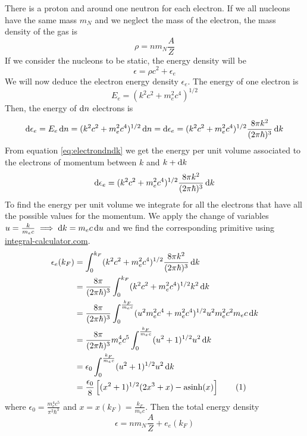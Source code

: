 \documentclass[a4paper]{article}
\newcommand\numberthis{\addtocounter{equation}{1}\tag{\theequation}}
\DeclareMathOperator{\asinh}{asinh}
\begin{document}
There is a proton and around one neutron for each electron. If we all nucleons have the same mass $m_N$ and we neglect the mass of the electron, the mass density of the gas is
\begin{equation} \label{eq:3}
    \rho = n m_N \frac{A}{Z}
\end{equation}
If we consider the nucleons to be static, the energy density will be
\begin{equation} \label{eq:1}
    \epsilon = \rho c^2 + \epsilon_e
\end{equation}
We will now deduce the electron energy density $\epsilon_e$.
The energy of one electron is
\begin{equation}
    E_e = (k^2c^2+m_e^2c^4)^{1/2}
\end{equation}
Then, the energy of $\odif{n}$ electrons is 
\begin{equation}
    \odif{\epsilon_e} = E_e \odif{n} = (k^2c^2+m_e^2c^4)^{1/2} \odif{n}=    \odif{\epsilon_e} = (k^2c^2+m_e^2c^4)^{1/2} \frac{8\pi k^2}{(2\pi\hbar)^3}\odif{k}
\end{equation}
From equation \eqref{eq:electrondndk} we get the energy per unit volume associated to the electrons of momentum between $k$ and $k+\odif{k}$
\begin{equation}
    \odif{\epsilon_e} = (k^2c^2+m_e^2c^4)^{1/2} \frac{8\pi k^2}{(2\pi\hbar)^3}\odif{k}
\end{equation}
To find the energy per unit volume we integrate for all the electrons that have all the possible values for the momentum. We apply the change of variables 
$u = \frac{k}{m_ec} \implies \odif{k} = m_e c \odif{u}$
and we find the corresponding primitive using \href{https://www.integral-calculator.com}{integral-calculator.com}.
\begin{align*} 
    \epsilon_e(k_F) & = \int^{k_F}_{0} (k^2c^2+m_e^2c^4)^{1/2} \frac{8\pi k^2}{(2\pi\hbar)^3}\odif{k} \\
    & = \frac{8\pi}{(2\pi\hbar)^3} \int^{k_F}_{0} (k^2c^2+m_e^2c^4)^{1/2} k^2 \odif{k}\\
    & = \frac{8\pi}{(2\pi\hbar)^3} \int^{\frac{k_F}{m_ec}}_{0} (u^2m_e^2c^4+m_e^2c^4)^{1/2} u^2 m_e^2 c^2 m_e c \odif{k}\\
    & = \frac{8\pi}{(2\pi\hbar)^3} m_e^4c^5 \int^{\frac{k_F}{m_ec}}_{0} (u^2+1)^{1/2} u^2 \odif{k}\\
    & = \epsilon_0 \int^{\frac{k_F}{m_ec}}_{0} (u^2+1)^{1/2} u^2 \odif{k}\\ 
    & = \frac{\epsilon_0}{8} \left[(x^2+1)^{1/2}(2x^3+x)-\asinh(x)\right] \numberthis \label{eq:2}
\end{align*}
where $\epsilon_0 = \frac{m_e^4c^5}{\pi^2\hbar^3}$ and $x = x(k_F) = \frac{k_F}{m_ec}$. 
Then the total energy density
\begin{equation}
    \epsilon = n m_N \frac{A}{Z} + e_e(k_F)
\end{equation}
\end{document}
